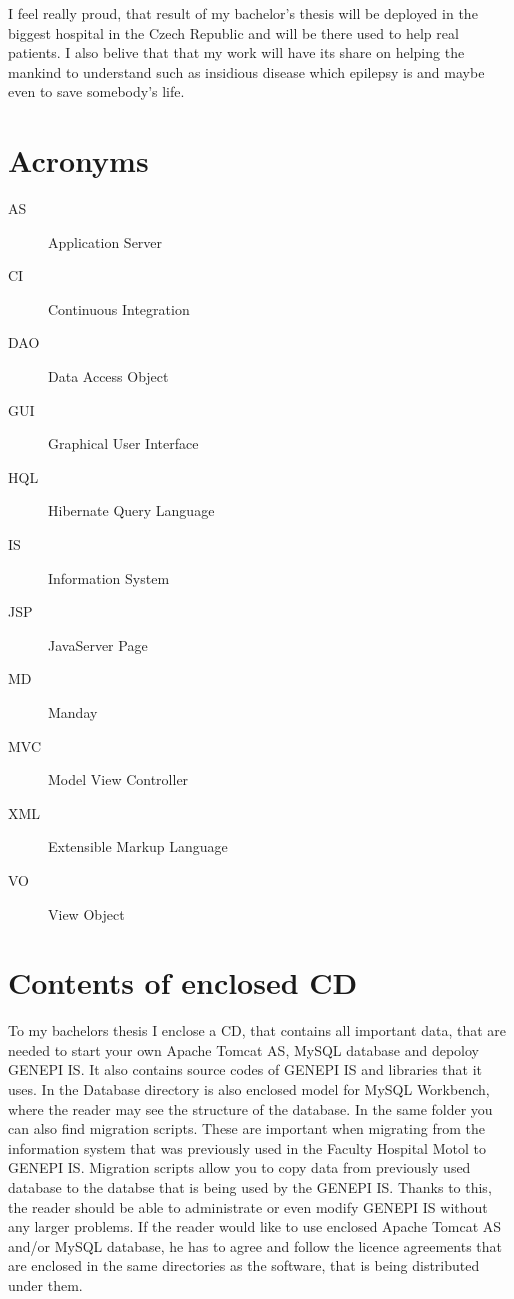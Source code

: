 \documentclass[thesis=B,english]{FITthesis}[2012/10/20]
\begin{document}
\begin{conclusion}
I feel really proud, that result of my bachelor's thesis will be deployed in the biggest hospital in the Czech Republic and will be there used to help real patients. I also belive that that my work will have its share on helping the mankind to understand such as insidious disease which epilepsy is and maybe even to save somebody's life.

\end{conclusion}




\appendix

\chapter{Acronyms}
\begin{description}
	\item[AS] Application Server
	\item[CI] Continuous Integration
	\item[DAO] Data Access Object
	\item[GUI] Graphical User Interface
	\item[HQL] Hibernate Query Language
	\item[IS] Information System
	\item[JSP] JavaServer Page
	\item[MD] Manday
	\item[MVC] Model View Controller
	\item[XML] Extensible Markup Language
	\item[VO] View Object
\end{description}

\chapter{Contents of enclosed CD}
To my bachelors thesis I enclose a CD, that contains all important data, that are needed to start your own Apache Tomcat AS, MySQL database and depoloy GENEPI IS. It also contains source codes of GENEPI IS and libraries that it uses. In the Database directory is also enclosed model for MySQL Workbench, where the reader may see the structure of the database. In the same folder you can also find migration scripts. These are important when migrating from the information system that was previously used in the Faculty Hospital Motol to GENEPI IS. Migration scripts allow you to copy data from previously used database to the databse that is being used by the GENEPI IS.
Thanks to this, the reader should be able to administrate or even modify GENEPI IS without any larger problems. If the reader would like to use enclosed Apache Tomcat AS and/or MySQL database, he has to agree and follow the licence agreements that are enclosed in the same directories as the software, that is being distributed under them.
\end{document}

